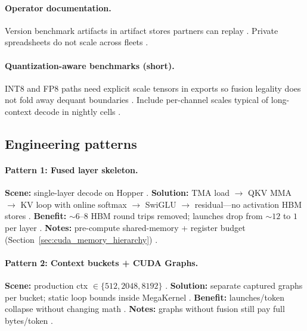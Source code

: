 \paragraph{Operator documentation.}
Version benchmark artifacts in artifact stores partners can replay \citep{yirage2026,chen2020compilerbasedhardw,patel2025llminference,taxbreak2026,memoryfloor2026}.
Private spreadsheets do not scale across fleets \citep{patel2025llminference}.

\paragraph{Quantization-aware benchmarks (short).}
INT8 and FP8 paths need explicit scale tensors in exports so fusion legality does not fold away dequant boundaries \citep{liu2024deepseekv3,yirage2026,memoryfloor2026}.
Include per-channel scales typical of long-context decode in nightly cells \citep{patel2025llminference,kwon2023vllm}.

\subsection{Engineering patterns}
\paragraph{Pattern 1: Fused layer skeleton.}
\textbf{Scene:} single-layer decode on Hopper \citep{taxbreak2026}.
\textbf{Solution:} TMA load $\rightarrow$ QKV MMA $\rightarrow$ KV loop with online softmax $\rightarrow$ SwiGLU $\rightarrow$ residual---no activation HBM stores \citep{dao2022flashattention,semianalysis2024tma}.
\textbf{Benefit:} ${\sim}6$--$8$ HBM round trips removed; launches drop from ${\sim}12$ to $1$ per layer \citep{memoryfloor2026}.
\textbf{Notes:} pre-compute shared-memory + register budget (Section~\ref{sec:cuda_memory_hierarchy}) \citep{yirage2026}.

\paragraph{Pattern 2: Context buckets + CUDA Graphs.}
\textbf{Scene:} production ctx $\in\{512,2048,8192\}$ \citep{kwon2023vllm,nvidia2024cudagraphs}.
\textbf{Solution:} separate captured graphs per bucket; static loop bounds inside MegaKernel \citep{yirage2026}.
\textbf{Benefit:} launches/token collapse without changing math \citep{taxbreak2026}.
\textbf{Notes:} graphs without fusion still pay full bytes/token \citep{memoryfloor2026}.

